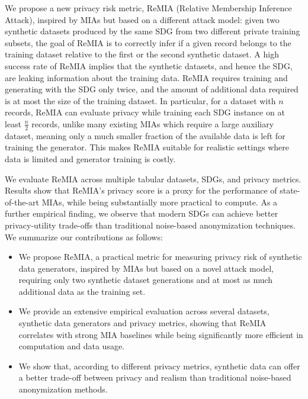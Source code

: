 We propose a new privacy risk metric, ReMIA (Relative Membership Inference Attack), inspired by MIAs but based on a different attack model: given two synthetic datasets produced by the same SDG from two different private training subsets, the goal of ReMIA is to correctly infer if a given record belongs to the training dataset relative to the first or the second synthetic dataset.
A high success rate of ReMIA implies that the synthetic datasets, and hence the SDG, are leaking information about the training data.
ReMIA requires training and generating with the SDG only twice, and the amount of additional data required is at most the size of the training dataset.
In particular, for a dataset with $n$ records, ReMIA can evaluate privacy while training each SDG instance on at least $\frac{n}{2}$ records, unlike many existing MIAs which require a large auxiliary dataset, meaning only a much smaller fraction of the available data is left for training the generator.
This makes ReMIA suitable for realistic settings where data is limited and generator training is costly.

We evaluate ReMIA across multiple tabular datasets, SDGs, and privacy metrics. Results show that ReMIA's privacy score is a proxy for the performance of state-of-the-art MIAs, while being substantially more practical to compute.
As a further empirical finding, we observe that modern SDGs can achieve better privacy-utility trade-offs than traditional noise-based anonymization techniques.
We summarize our contributions as follows:
\begin{itemize}
  \item We propose ReMIA, a practical metric for measuring privacy risk of synthetic data generators, inspired by MIAs but based on a novel attack model, requiring only two synthetic dataset generations and at most as much additional data as the training set.
  \item We provide an extensive empirical evaluation across several datasets, synthetic data generators and privacy metrics, showing that ReMIA correlates with strong MIA baselines while being significantly more efficient in computation and data usage.
  \item We show that, according to different privacy metrics, synthetic data can offer a better trade-off between privacy and realism than traditional noise-based anonymization methods.
\end{itemize}
